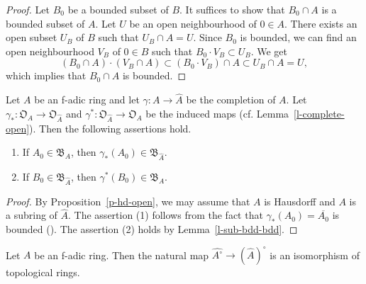 \begin{proof}
Let $B_0$ be a bounded subset of $B$. 
It suffices to show that $B_0 \cap A$ is a bounded subset of $A$. 
Let $U$ be an open neighbourhood of $0 \in A$. 
There exists an open subset $U_B$ of $B$ such that $U_B \cap A=U$. 
Since $B_0$ is bounded, 
we can find an open neighbourhood $V_B$ of $0 \in B$ such that 
$B_0 \cdot V_B \subset U_B$. 
We get  
$$(B_0 \cap A)\cdot (V_B \cap A) \subset 
(B_0 \cdot V_B) \cap A \subset U_B \cap A=U,$$
which implies that $B_0 \cap A$ is bounded. 
\end{proof}



\begin{lem}\label{l-complete-open2}
Let $A$ be an f-adic ring and 
let $\gamma:A \to \widehat{A}$ be the completion of $A$. 
Let $\gamma_*:\mathfrak O_A \to \mathfrak O_{\widehat{A}}$ and $\gamma^*:\mathfrak O_{\widehat{A}} \to \mathfrak O_{A}$ be 
the induced maps (cf. Lemma~\ref{l-complete-open}). 
Then the following assertions hold. 
\begin{enumerate}
\item If $A_0 \in \mathfrak B_{A}$, then $\gamma_*(A_0) 
\in \mathfrak B_{\widehat{A}}$.
\item If $B_0 \in \mathfrak B_{\widehat{A}}$, then $\gamma^*(B_0) \in \mathfrak B_{A}$. 
\end{enumerate}
\end{lem}

\begin{proof}
By Proposition~\ref{p-hd-open}, we may assume that $A$ is Hausdorff and 
$A$ is a subring of $\widehat{A}$. 
The assertion (1) follows from the fact that 
$\gamma_*(A_0)=\overline{A_0}$ is bounded (\cite[Lemma 1.6(i)]{Hub93}). 
The assertion (2) holds by Lemma~\ref{l-sub-bdd-bdd}. 
\end{proof}


\begin{lem}\label{l-pbdd-completion}
Let $A$ be an f-adic ring. 
Then the natural map $\widehat{A^{\circ}} \to (\widehat{A})^{\circ}$ is an isomorphism of topological rings.
\end{lem}

